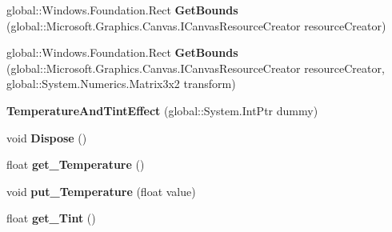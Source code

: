 \begin{DoxyCompactItemize}
global\+::\+Windows.\+Foundation.\+Rect {\bfseries Get\+Bounds} (global\+::\+Microsoft.\+Graphics.\+Canvas.\+I\+Canvas\+Resource\+Creator resource\+Creator)
\item 
\mbox{\label{class_microsoft_1_1_graphics_1_1_canvas_1_1_effects_1_1_temperature_and_tint_effect_aa1c4ce395cadd2b55228ea1a45617bb1}} 
global\+::\+Windows.\+Foundation.\+Rect {\bfseries Get\+Bounds} (global\+::\+Microsoft.\+Graphics.\+Canvas.\+I\+Canvas\+Resource\+Creator resource\+Creator, global\+::\+System.\+Numerics.\+Matrix3x2 transform)
\item 
\mbox{\label{class_microsoft_1_1_graphics_1_1_canvas_1_1_effects_1_1_temperature_and_tint_effect_a81f3532465d1de1b98e13a50b2571a0f}} 
{\bfseries Temperature\+And\+Tint\+Effect} (global\+::\+System.\+Int\+Ptr dummy)
\item 
\mbox{\label{class_microsoft_1_1_graphics_1_1_canvas_1_1_effects_1_1_temperature_and_tint_effect_a031064924b7d131d2cb24fc23669ef2f}} 
void {\bfseries Dispose} ()
\item 
\mbox{\label{class_microsoft_1_1_graphics_1_1_canvas_1_1_effects_1_1_temperature_and_tint_effect_a28db1ed9968ed328d9fc6bfe5b631a3c}} 
float {\bfseries get\+\_\+\+Temperature} ()
\item 
\mbox{\label{class_microsoft_1_1_graphics_1_1_canvas_1_1_effects_1_1_temperature_and_tint_effect_adb69589a791103c1ccc70be5fd283801}} 
void {\bfseries put\+\_\+\+Temperature} (float value)
\item 
\mbox{\label{class_microsoft_1_1_graphics_1_1_canvas_1_1_effects_1_1_temperature_and_tint_effect_a59625010f53353aeadc357e732f4b316}} 
float {\bfseries get\+\_\+\+Tint} ()
\item 
\mbox{\label{class_microsoft_1_1_graphics_1_1_canvas_1_1_effects_1_1_temperature_and_tint_effect_ac84f3870c687f56f7b661e60a685bac4}} 

\end{DoxyCompactItemize}
